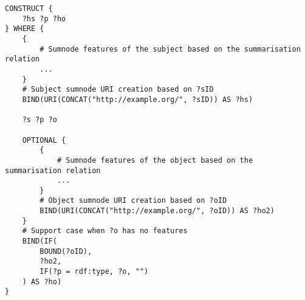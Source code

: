 \begin{verbatim}
CONSTRUCT {
    ?hs ?p ?ho
} WHERE {
    {
        # Sumnode features of the subject based on the summarisation relation
        ...
    }
    # Subject sumnode URI creation based on ?sID
    BIND(URI(CONCAT("http://example.org/", ?sID)) AS ?hs)

    ?s ?p ?o

    OPTIONAL {
        {
            # Sumnode features of the object based on the summarisation relation
            ...
        }
        # Object sumnode URI creation based on ?oID
        BIND(URI(CONCAT("http://example.org/", ?oID)) AS ?ho2)
    }
    # Support case when ?o has no features
    BIND(IF(
        BOUND(?oID),
        ?ho2,
        IF(?p = rdf:type, ?o, "")
    ) AS ?ho)
}
\end{verbatim}

